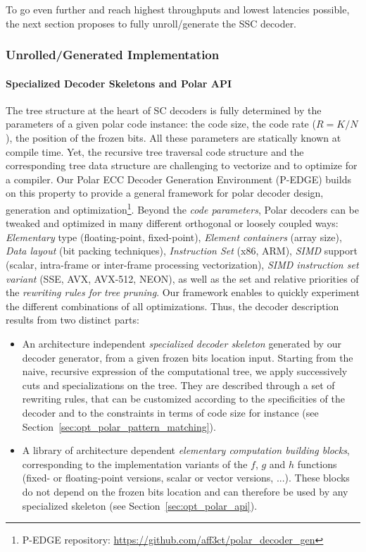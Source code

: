 To go even further and reach highest throughputs and lowest latencies possible,
the next section proposes to fully unroll/generate the SSC decoder.

\subsubsection{Unrolled/Generated Implementation}
\label{sec:opt_polar_pedge}

\paragraph{Specialized Decoder Skeletons and Polar API}

The tree structure at the heart of SC decoders is fully determined by the
parameters of a given polar code instance: the code size, the code rate ($R = K
/ N$), the position of the frozen bits. All these parameters are  statically
known at compile time. Yet, the recursive tree traversal code structure and the
corresponding tree data structure are challenging to vectorize and to optimize
for a compiler. Our Polar ECC Decoder Generation Environment (P-EDGE) builds on
this property to provide a general framework for polar decoder design,
generation and optimization\footnote{P-EDGE repository:
\url{https://github.com/aff3ct/polar_decoder_gen}}. Beyond the \emph{code
parameters}, Polar decoders can be tweaked and optimized in many different
orthogonal or loosely coupled ways: \emph{Elementary} type (floating-point,
fixed-point), \emph{Element containers} (array size), \emph{Data layout} (bit
packing techniques), \emph{Instruction Set} (x86, ARM\R), \emph{SIMD} support
(scalar, intra-frame or inter-frame processing vectorization), \emph{SIMD
instruction set variant} (SSE, AVX, AVX-512, NEON), as well as the set and
relative priorities of the \emph{rewriting rules for tree pruning}. Our
framework enables to quickly experiment the different combinations of all
optimizations. Thus, the decoder description results from two distinct parts:
\begin{itemize}
  \item An architecture independent \emph{specialized decoder skeleton}
    generated by our decoder generator, from a given frozen bits location input.
    Starting from the naive, recursive expression of the computational tree, we
    apply successively cuts and specializations on the tree. They are described
    through a set of rewriting rules, that can be customized according to the
    specificities of the decoder and to the constraints in terms of code size
    for instance (see Section~\ref{sec:opt_polar_pattern_matching}).
  \item A library of architecture dependent \emph{elementary computation
    building blocks}, corresponding to the implementation variants of the $f$,
    $g$ and $h$ functions (fixed- or floating-point versions, scalar or vector
    versions, ...). These blocks do not depend on the frozen bits location and
    can therefore be used by any specialized skeleton (see
    Section~\ref{sec:opt_polar_api}).
\end{itemize}

